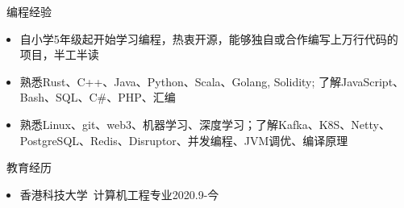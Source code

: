 \documentclass[UTF8]{resume}
\begin{document}
  
\begin{rSection}{\faCogs~编程经验}
    \begin{itemize}
        \itemsep -0.5em
        \item 自小学5年级起开始学习编程，热衷开源，能够独自或合作编写上万行代码的项目，半工半读
        \item 熟悉Rust、C++、Java、Python、Scala、Golang, Solidity; 了解JavaScript、Bash、SQL、C\#、PHP、汇编
        \item 熟悉Linux、git、web3、机器学习、深度学习；了解Kafka、K8S、Netty、PostgreSQL、Redis、Disruptor、并发编程、JVM调优、编译原理
    \end{itemize}
    
\end{rSection}
\begin{rSection}{\faGraduationCap~教育经历}
    \begin{itemize}
        \item 香港科技大学~计算机工程专业\hfill 2020.9-今
    \end{itemize}
\end{rSection}
\end{document}
